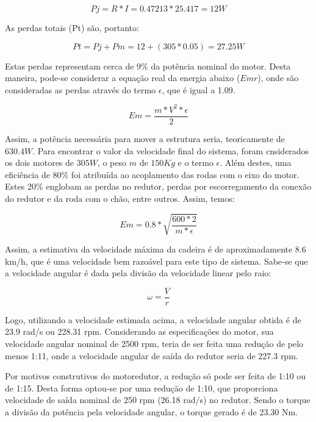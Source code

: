  \begin{equation}
  Pj = R*I = 0.47213*25.417 = 12 W
  \end{equation}

  As perdas totais (Pt) são, portanto:

  \begin{equation}
  Pt = Pj+Pm = 12+(305*0.05) = 27.25 W
  \end{equation}

  Estas perdas representam cerca de 9\% da potência nominal do motor. Desta maneira, pode-se considerar a equação real da energia abaixo ($Emr$), onde são consideradas as perdas através do termo $\epsilon$, que é igual a 1.09.

  \begin{equation}
    Em = \frac{m*V^2*\epsilon}{2}
  \end{equation}

  Assim, a potência necessária para mover a estrutura seria, teoricamente de $630.4 W$. Para encontrar o valor da velocidade final do sistema, foram cnsiderados os dois motores de $305 W$, o peso $m$ de $150 Kg$ e o termo $\epsilon$. Além destes, uma eficiência de 80\% foi atribuída ao acoplamento das rodas com o eixo do motor. Estes 20\% englobam as perdas no redutor, perdas por escorregamento da conexão do redutor e da roda com o chão, entre outros. Assim, temos:

  \begin{equation}
  Em = 0.8*\sqrt{\frac{600*2}{m*\epsilon}}
  \end{equation}

  Assim, a estimativa da velocidade máxima da cadeira é de aproximadamente 8.6 km/h, que é uma velocidade bem razoável para este tipo de sistema. Sabe-se que a velocidade angular é dada pela divisão da velocidade linear pelo raio:

  \begin{equation}
  \omega = \frac{V}{r}
  \end{equation}

  Logo, utilizando a velocidade estimada acima, a velocidade angular obtida é de 23.9 rad/s ou 228.31 rpm. Considerando as especificações do motor, sua velocidade angular nominal de 2500 rpm, teria de ser feita uma redução de pelo menos 1:11, onde a velocidade angular de saída do redutor seria de 227.3 rpm.

  Por motivos construtivos do motoredutor, a redução só pode ser feita de 1:10 ou de 1:15. Desta forma optou-se por uma redução de 1:10, que proporciona velocidade de saída nominal de 250 rpm (26.18 rad/s) no redutor. Sendo o torque a divisão da potência pela velocidade angular, o torque gerado é de 23.30 Nm.

